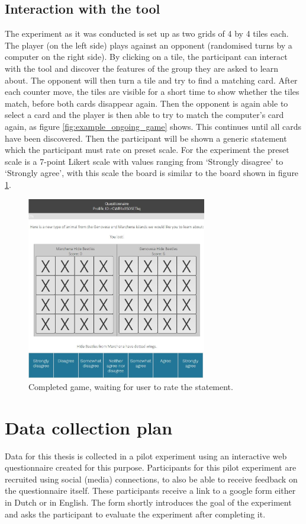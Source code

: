 \documentclass[twoside]{uva-inf-bachelor-thesis}
\theoremstyle{definition}
\begin{document}
\subsection{Interaction with the tool}
The experiment as it was conducted is set up as two grids of 4 by 4 tiles each. The player (on the left side) plays against an opponent (randomised turns by a computer on the right side). By clicking on a tile, the participant can interact with the tool and discover the features of the group they are asked to learn about. The opponent will then turn a tile and try to find a matching card. After each counter move, the tiles are visible for a short time to show whether the tiles match, before both cards disappear again. Then the opponent is again able to select a card and the player is then able to try to match the computer's card again, as figure \ref{fig:example_ongoing_game} shows. This continues until all cards have been discovered. Then the participant will be shown a generic statement which the participant must rate on preset scale. For the experiment the preset scale is a 7-point Likert scale with values ranging from `Strongly disagree' to `Strongly agree', with this scale the board is similar to the board shown in figure \ref{fig:example_finished_game}.

\begin{figure}[h]
    \centering
    \includegraphics[width=0.7\textwidth]{Project/Thesis/LaTeX/images/uva_gen_example3.JPG}
    \caption{Completed game, waiting for user to rate the statement.}
    \label{fig:example_finished_game}
\end{figure}

\section{Data collection plan}
Data for this thesis is collected in a pilot experiment using an interactive web questionnaire created for this purpose. Participants for this pilot experiment are recruited using social (media) connections, to also be able to receive feedback on the questionnaire itself. These participants receive a link to a google form either in Dutch or in English. The form shortly introduces the goal of the experiment and asks the participant to evaluate the experiment after completing it.
\end{document}
